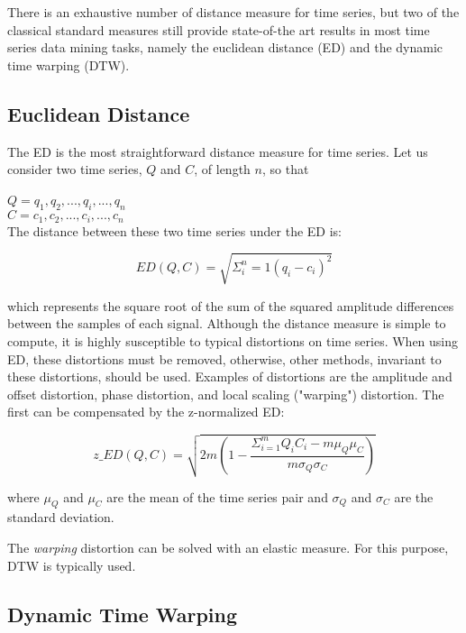 There is an exhaustive number of distance measure for time series, but two of the classical standard measures still provide state-of-the art results in most time series data mining tasks, namely the euclidean distance (ED) and the dynamic time warping (DTW).
\par

\subsection{Euclidean Distance}
\label{subsec:ed}

The ED is the most straightforward distance measure for time series. Let us consider two time series, $Q$ and $C$, of length $n$, so that\\
\\
$Q = q_1, q_2, ..., q_i, ..., q_n$\\
$C = c_1, c_2, ..., c_i, ..., c_n$\\

The distance between these two time series under the ED is:

\begin{equation}
ED(Q,C) = \sqrt{\Sigma^n_i=1 (q_i - c_i)^2}
\end{equation}

which represents the square root of the sum of the squared amplitude differences between the samples of each signal. Although the distance measure is simple to compute, it is highly susceptible to typical distortions on time series. When using ED, these distortions must be removed, otherwise, other methods, invariant to these distortions, should be used. Examples of distortions are the amplitude and offset distortion, phase distortion, and local scaling ("warping") distortion. The first can be compensated by the z-normalized ED:

\begin{equation}
\label{eq:norm_ed}
z\_ED(Q,C) = \sqrt{2m(1-\frac{\Sigma^m_{i=1}Q_iC_i - m\mu_Q\mu_C}{m\sigma_Q\sigma_C})}
\end{equation}

where $\mu_Q$ and $\mu_C$ are the mean of the time series pair and $\sigma_Q$ and $\sigma_C$ are the standard deviation.

The \textit{warping} distortion can be solved with an elastic measure. For this purpose, DTW is typically used.

\subsection{Dynamic Time Warping}
\label{subsec:dtw}

